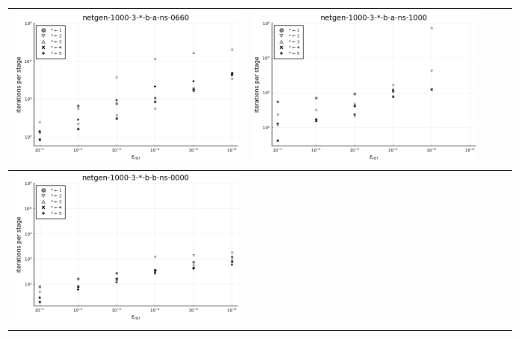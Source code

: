 \documentclass{article}
\begin{document}
\begin{landscape}
\begin{center}
\begin{longtable}{| c | c | c | c |}
\includegraphics[height=0.22\textheight]{itepst_fixlim_netgen-1000-3-_-b-a-ns-0660.png} &
\includegraphics[height=0.22\textheight]{itepst_fixlim_netgen-1000-3-_-b-a-ns-1000.png} \\
                \hline
\includegraphics[height=0.22\textheight]{itepst_fixlim_netgen-1000-3-_-b-b-ns-0000.png} &

\end{longtable}
\end{center}
\end{landscape}
\end{document}
